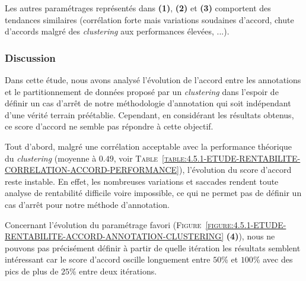 			Les autres paramétrages représentés dans \textbf{(1)}, \textbf{(2)} et \textbf{(3)} comportent des tendances similaires (corrélation forte mais variations soudaines d'accord, chute d'accords malgré des \textit{clustering} aux performances élevées, ...).

		\subsubsection{Discussion}
		
			Dans cette étude, nous avons analysé l'évolution de l'accord entre les annotations et le partitionnement de données proposé par un \textit{clustering} dans l'espoir de définir un cas d'arrêt de notre méthodologie d'annotation qui soit indépendant d'une vérité terrain préétablie.
			Cependant, en considérant les résultats obtenus, ce score d'accord ne semble pas répondre à cette objectif.
			
			Tout d'abord, malgré une corrélation acceptable avec la performance théorique du \textit{clustering} (moyenne à $0.49$, voir \textsc{Table~\ref{table:4.5.1-ETUDE-RENTABILITE-CORRELATION-ACCORD-PERFORMANCE}}), l'évolution du score d'accord reste instable.
			En effet, les nombreuses variations et saccades rendent toute analyse de rentabilité difficile voire impossible, ce qui ne permet pas de définir un cas d'arrêt pour notre méthode d'annotation.
			
			\begin{leftBarExamples}
				Concernant l'évolution du paramétrage favori (\textsc{Figure~\ref{figure:4.5.1-ETUDE-RENTABILITE-ACCORD-ANNOTATION-CLUSTERING}} \textbf{(4)}), nous ne pouvons pas précisément définir à partir de quelle itération les résultats semblent intéressant car le score d'accord oscille longuement entre $50$\% et $100$\% avec des pics de plus de $25$\% entre deux itérations. 
			\end{leftBarExamples}
			
